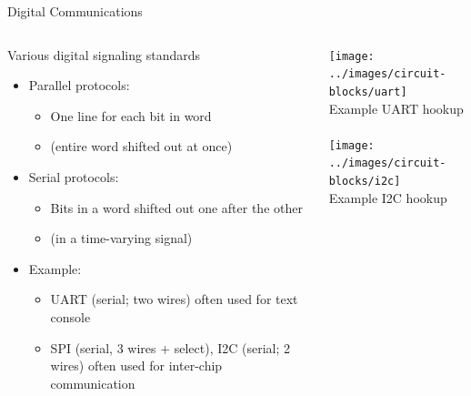 \documentclass{beamer}
\begin{document}
\begin{frame}{Digital Communications}
  \begin{columns}[T]
    \begin{column}{.6\textwidth}
      Various digital signaling standards
      \begin{itemize}
        \item Parallel protocols:
        \begin{itemize}
          \item One line for each bit in word
          \item (entire word shifted out at once)
        \end{itemize}
        \item Serial protocols:
        \begin{itemize}
          \item Bits in a word shifted out one after the other
          \item (in a time-varying signal)
        \end{itemize}
        \item Example:
        \begin{itemize}
          \item UART (serial; two wires) often used for text console
          \item SPI (serial, 3 wires + select), I2C (serial; 2 wires) often used for inter-chip communication
        \end{itemize}
      \end{itemize}
    \end{column}

    \begin{column}{0.4\textwidth} \centering
      \texttt{[image: ../images/circuit-blocks/uart]} \\
      Example UART hookup \\
      ~ \\
      \texttt{[image: ../images/circuit-blocks/i2c]} \\
      Example I2C hookup
    \end{column}
  \end{columns}
\end{frame}
\end{document}
